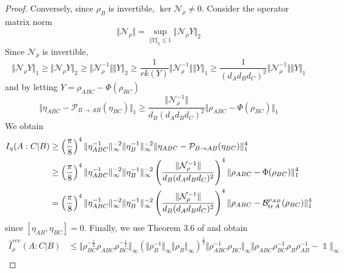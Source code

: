 \documentclass[11pt]{article}
\theoremstyle{newdefinition}
\theoremstyle{newplain}
\theoremstyle{myplain}
\DeclareMathOperator{\1}{\mathds{1}}
\newcommand{\PCR}[1]{{\color{blue}#1}}
\begin{document}
{\begin{proof}
\PCR{ Conversely, since $\rho_B$ is invertible,  $\ker \mathcal{N}_{\rho}\neq 0$. Consider the operator matrix norm
    \begin{equation}
        \Vert \mathcal{N}_{\rho}\Vert=\sup_{\Vert Y \Vert_2 \leq 1}\Vert \mathcal{N}_{\rho} Y\Vert_2
    \end{equation}
    Since $\mathcal{N}_{\rho}$ is invertible,
    \begin{equation}
        \Vert \mathcal{N}_{\rho} Y\Vert_1\geq \Vert \mathcal{N}_{\rho} Y\Vert_2\geq \Vert \mathcal{N}_{\rho}^{-1}\Vert \Vert Y \Vert_2\geq  \frac{1}{rk(Y)}\Vert \mathcal{N}_{\rho}^{-1}\Vert \Vert Y \Vert_1\geq   \frac{1}{(d_Ad_Bd_C)^2}\Vert \mathcal{N}_{\rho}^{-1}\Vert \Vert Y \Vert_1
    \end{equation} 
and by letting $Y=\rho_{ABC}-\Phi(\rho_{BC})$
\begin{equation}
    \Vert \eta_{ABC}-\mathcal{P}_{B\rightarrow AB}(\eta_{BC})\Vert_1 \geq \frac{\Vert \mathcal{N}_{\rho}^{-1}\Vert}{d_B (d_Ad_Bd_C)^2} \Vert \rho_{ABC}-\Phi(\rho_{BC})\Vert_1
\end{equation}
We obtain
\begin{equation}
    \begin{split}
        I_{\eta}(A:C\vert B)&\geq \left(\frac{\pi}{8}\right)^4\Vert \eta_{ABC}^{-1}\Vert_{\infty}^{-2} \Vert \eta_{B}^{-1}\Vert_{\infty}^{-2}\Vert \eta_{ABC}-\mathcal{P}_{B\rightarrow AB}(\eta_{BC})\Vert_1^4\\
        &\geq \left(\frac{\pi}{8}\right)^4\Vert \eta_{ABC}^{-1}\Vert_{\infty}^{-2} \Vert \eta_{B}^{-1}\Vert_{\infty}^{-2}\left(\frac{\Vert \mathcal{N}_{\rho}^{-1}\Vert}{d_B (d_Ad_Bd_C)^2}\right)^4\Vert  \rho_{ABC}-\Phi(\rho_{BC})\Vert_1^4\\
        &= \left(\frac{\pi}{8}\right)^4\Vert \eta_{ABC}^{-1}\Vert_{\infty}^{-2} \Vert \eta_{B}^{-1}\Vert_{\infty}^{-2}\left(\frac{\Vert \mathcal{N}_{\rho}^{-1}\Vert}{d_B (d_Ad_Bd_C)^2} \right)^4\Vert  \rho_{ABC}-\mathcal{B}_{\tr A}^{\rho_{AB}}(\rho_{BC})\Vert_1^4
    \end{split}
\end{equation}
since $[\eta_{AB},\eta_{BC}]=0$. Finally, we use Theorem 3.6 of \cite{gondolf2024conditional} and obtain
\begin{equation}
    \begin{split}
        \widehat{I}^{rev}_{\rho}(A:C | B) & \leq \Vert \rho_{BC}^{-\frac{1}{2}}\rho_{ABC}\rho_{BC}^{-\frac{1}{2}}\Vert_{\infty}(\Vert \rho_B^{-1}\Vert_{\infty} \Vert \rho_B \Vert_{\infty})^{\frac{1}{2}}\Vert \rho_{ABC}^{-1}\rho_{BC}\Vert_{\infty}\Vert \rho_{ABC}\rho_{BC}^{-1}\rho_B \rho_{AB}^{-1}- \1 \Vert_{\infty}\\

\end{split}
\end{equation}}
\end{proof}}
\end{document}
